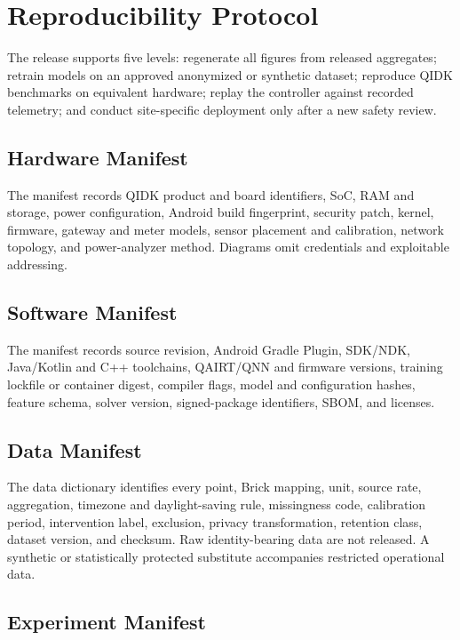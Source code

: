 \section{Reproducibility Protocol}

The release supports five levels: regenerate all figures from released aggregates; retrain models on an approved anonymized or synthetic dataset; reproduce QIDK benchmarks on equivalent hardware; replay the controller against recorded telemetry; and conduct site-specific deployment only after a new safety review.

\subsection{Hardware Manifest}

The manifest records QIDK product and board identifiers, SoC, RAM and storage, power configuration, Android build fingerprint, security patch, kernel, firmware, gateway and meter models, sensor placement and calibration, network topology, and power-analyzer method. Diagrams omit credentials and exploitable addressing.

\subsection{Software Manifest}

The manifest records source revision, Android Gradle Plugin, SDK/NDK, Java/Kotlin and C++ toolchains, QAIRT/QNN and firmware versions, training lockfile or container digest, compiler flags, model and configuration hashes, feature schema, solver version, signed-package identifiers, SBOM, and licenses.

\subsection{Data Manifest}

The data dictionary identifies every point, Brick mapping, unit, source rate, aggregation, timezone and daylight-saving rule, missingness code, calibration period, intervention label, exclusion, privacy transformation, retention class, dataset version, and checksum. Raw identity-bearing data are not released. A synthetic or statistically protected substitute accompanies restricted operational data.

\subsection{Experiment Manifest}

